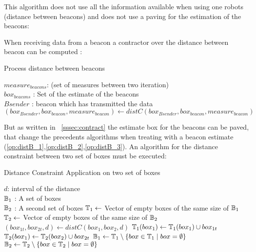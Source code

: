 This algorithm does not use all the information available when using one robots (distance between beacons) and does not use a paving for the estimation of the beacons:

When receiving data from a beacon a contractor over the distance between beacon can be computed :

\begin{algorithm}[H]
\caption{Process distance between beacons }
\label{alg:distBetBeaconsSlam}
\begin{algorithmic}[1]
\REQUIRE $measure_{beacons}$: (set of measures between two iteration)\\
   $box_{beacons}$ : Set of the estimate of the beacons\\
   $Bsender$ : beacon which has transmitted the data  
\label{op:distB_3}
\STATE $(box_{Bsender},box_{beacon},measure_{beacon}) \leftarrow distC(box_{Bsender},box_{beacon},measure_{beacon})$
\ENDFOR
\end{algorithmic}
\end{algorithm}

But as written in ~\ref{sssec:contract} the estimate box for the beacons can be paved, that change the precedents
algorithms when treating with a beacon estimate (\ref{op:distB_1},\ref{op:distB_2},\ref{op:distB_3}). An algorithm for the distance constraint between two set of boxes must be executed:

\begin{algorithm}[H]
\caption{Distance Constraint Application on two set of boxes }
\label{alg:distTwoSet}
\begin{algorithmic}[1]
\REQUIRE $d$: interval of the distance\\
   $\mathbb{B_{\textnormal{1}}}$ : A set of boxes\\
   $\mathbb{B_{\textnormal{2}}}$ : A second set of boxes
\STATE $\mathbb{T_{\textnormal{1}}} \leftarrow$ Vector of empty boxes of the same size of $\mathbb{B_{\textnormal{1}}}$
\STATE $\mathbb{T_{\textnormal{2}}} \leftarrow$ Vector of empty boxes of the same size of $\mathbb{B_{\textnormal{2}}}$
\STATE $(box_{1t},box_{2t},d) \leftarrow distC(box_1,box_2,d)$
\STATE $\mathbb{T_{\textnormal{1}}}(box_1) \leftarrow \mathbb{T_{\textnormal{1}}}(box_1)  \cup box_{1t}$
\STATE $\mathbb{T_{\textnormal{2}}}(box_1) \leftarrow \mathbb{T_{\textnormal{2}}}(box_2)  \cup box_{2t}$
\ENDFOR
\ENDFOR
\STATE $\mathbb{B_{\textnormal{1}}} \leftarrow \mathbb{T_{\textnormal{1}}}\setminus\{box \in \mathbb{T_{\textnormal{1}}} \mid box = \emptyset \}$
\STATE $\mathbb{B_{\textnormal{2}}} \leftarrow \mathbb{T_{\textnormal{2}}}\setminus\{box \in \mathbb{T_{\textnormal{2}}} \mid box = \emptyset \}$
\end{algorithmic}
\end{algorithm}


